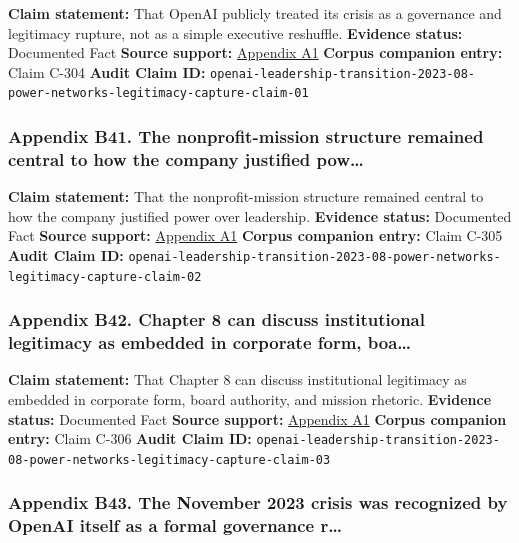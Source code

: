 \documentclass[
  american,
  11pt,
  letterpaper,
]{article}
\begin{document}
\textbf{Claim statement:} That OpenAI publicly treated its crisis as a
governance and legitimacy rupture, not as a simple executive reshuffle.
\textbf{Evidence status:} Documented Fact \textbf{Source support:}
\hyperref[appendix-a1-openai-announces-leadership-transition]{Appendix
A1} \textbf{Corpus companion entry:} Claim C-304 \textbf{Audit Claim
ID:}
\texttt{openai-leadership-transition-2023-08-power-networks-legitimacy-capture-claim-01}

\subsubsection{Appendix B41. The nonprofit-mission structure remained
central to how the company justified
pow\ldots{}}\label{appendix-b41-the-nonprofit-mission-structure-remained-central-to-how-the-company-justified-pow}

\textbf{Claim statement:} That the nonprofit-mission structure remained
central to how the company justified power over leadership.
\textbf{Evidence status:} Documented Fact \textbf{Source support:}
\hyperref[appendix-a1-openai-announces-leadership-transition]{Appendix
A1} \textbf{Corpus companion entry:} Claim C-305 \textbf{Audit Claim
ID:}
\texttt{openai-leadership-transition-2023-08-power-networks-legitimacy-capture-claim-02}

\subsubsection{Appendix B42. Chapter 8 can discuss institutional
legitimacy as embedded in corporate form,
boa\ldots{}}\label{appendix-b42-chapter-8-can-discuss-institutional-legitimacy-as-embedded-in-corporate-form-boa}

\textbf{Claim statement:} That Chapter 8 can discuss institutional
legitimacy as embedded in corporate form, board authority, and mission
rhetoric. \textbf{Evidence status:} Documented Fact \textbf{Source
support:}
\hyperref[appendix-a1-openai-announces-leadership-transition]{Appendix
A1} \textbf{Corpus companion entry:} Claim C-306 \textbf{Audit Claim
ID:}
\texttt{openai-leadership-transition-2023-08-power-networks-legitimacy-capture-claim-03}

\subsubsection{Appendix B43. The November 2023 crisis was recognized by
OpenAI itself as a formal governance
r\ldots{}}\label{appendix-b43-the-november-2023-crisis-was-recognized-by-openai-itself-as-a-formal-governance-r}
\end{document}

